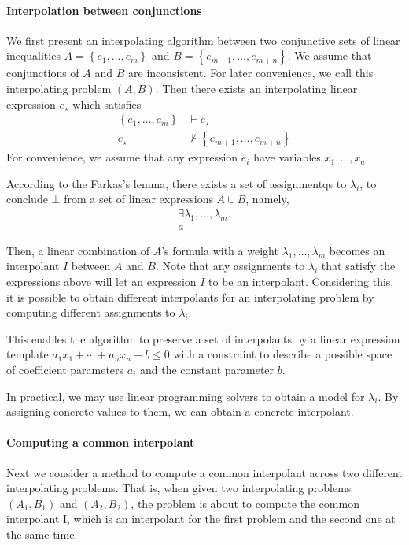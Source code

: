 \paragraph{Interpolation between conjunctions}
We first present an interpolating algorithm between two conjunctive
sets of linear inequalities $A = \left\lbrace e_1,\ldots,e_m
\right\rbrace$ and $B = \left\lbrace e_{m+1},\ldots,e_{m+n}
\right\rbrace$.  We assume that conjunctions of $A$ and $B$ are
inconsistent.  For later convenience, we call this interpolating
problem $\left( A, B \right)$.  Then there exists an interpolating
linear expression $e_\star$ which satisfies
\begin{align*}
\left\lbrace e_1,\ldots,e_m \right\rbrace & \vdash e_\star \\
e_\star & \nvdash \left\lbrace e_{m+1},\ldots,e_{m+n} \right\rbrace
\end{align*}
For convenience, we assume that any expression $e_i$ have variables
$x_1, \ldots, x_a$.

According to the Farkas's lemma, there exists a set of assignmentqs to
$\lambda_i$, to conclude $\bot$ from a set of linear expressions $A
\cup B$, namely,
\begin{align*}
\exists \lambda_1, \ldots, \lambda_m. \\
a %
\end{align*}

Then, a linear combination of $A$'s formula with a weight $\lambda_1,
\ldots, \lambda_m$ becomes an interpolant $I$ between $A$ and $B$.
Note that any assignments to $\lambda_i$ that satisfy the expressions
above will let an expression $I$ to be an interpolant.  Considering
this, it is possible to obtain different interpolants for an
interpolating problem by computing different assignments to
$\lambda_i$.

This enables the algorithm to preserve a set of interpolants by a
linear expression template $a_1 x_1 + \cdots + a_n x_n + b \leq 0$
with a constraint to describe a possible space of coefficient
parameters $a_i$ and the constant parameter $b$.

In practical, we may use linear programming solvers to obtain a model
for $\lambda_i$.  By assigning concrete values to them, we can obtain
a concrete interpolant.


\paragraph{Computing a common interpolant}
Next we consider a method to compute a common interpolant across two
different interpolating problems.  That is, when given two
interpolating problems $\left(A_1, B_1 \right)$ and $\left(A_2, B_2
\right)$, the problem is about to compute the common interpolant I,
which is an interpolant for the first problem and the second one at
the same time.

